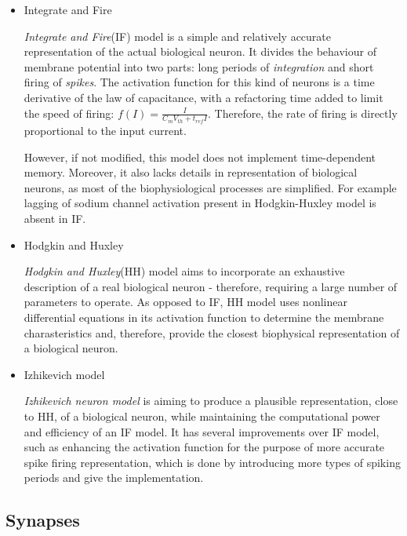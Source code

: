 \begin{itemize}

\item Integrate and Fire

\emph{Integrate and Fire}(IF) model is a simple and relatively accurate representation of the actual biological neuron.
It divides the behaviour of membrane potential into two parts: long periods of \emph{integration} and short firing of \emph{spikes}. The activation function for this kind of neurons is
a time derivative of the law of capacitance, with a refactoring time added to limit the speed of firing: \begin{math}f(I) = \frac{I}{C_{m}V_{th} + t_{ref}I}\end{math}.
Therefore, the rate of firing is directly proportional to the input current.\cite{WulframGerstner2002}

However, if not modified, this model does not implement time-dependent memory. Moreover, it also lacks details in representation of biological neurons, as most of the biophysiological 
processes are simplified. For example lagging of sodium channel activation present in Hodgkin-Huxley model is absent in IF.\cite{IFModel}

\item Hodgkin and Huxley

\emph{Hodgkin and Huxley}(HH) model aims to incorporate an exhaustive description of a real biological neuron - therefore, requiring a large number of parameters to operate.
As opposed to IF, HH model uses nonlinear differential equations in its activation function to determine the membrane charasteristics and, therefore, provide the closest 
biophysical representation of a biological neuron.\cite{Hodgkin1952}

\item Izhikevich model

\emph{Izhikevich neuron model} is aiming to produce a plausible representation, close to HH, of a biological neuron, while maintaining the computational power and efficiency of an IF model.
It has several improvements over IF model, such as enhancing the activation function for the purpose of more accurate spike firing representation, which is done by introducing more 
types of spiking periods and give the implementation.\cite{Izhikevich2003}

\end{itemize}

\subsection{Synapses}


